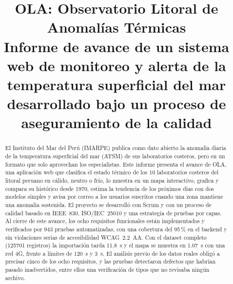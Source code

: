 \documentclass[conference,a4paper]{IEEEtran}
\begin{document}
\title{OLA: Observatorio Litoral de Anomalías Térmicas\\
\large Informe de avance de un sistema web de monitoreo y alerta de la temperatura superficial del mar desarrollado bajo un proceso de aseguramiento de la calidad}

\author{
}

\maketitle

\begin{abstract}
El Instituto del Mar del Perú (IMARPE) publica como dato abierto la anomalía diaria de la temperatura superficial del mar (ATSM) de sus laboratorios costeros, pero en un formato que solo aprovechan los especialistas. Este informe presenta el avance de OLA, una aplicación web que clasifica el estado térmico de los 10 laboratorios costeros del litoral peruano en cálido, neutro o frío, lo muestra en un mapa interactivo, grafica y compara su histórico desde 1970, estima la tendencia de los próximos días con dos modelos simples y avisa por correo a los usuarios suscritos cuando una zona mantiene una anomalía sostenida. El proyecto se desarrolló con Scrum y con un proceso de calidad basado en IEEE~830, ISO/IEC~25010 y una estrategia de pruebas por capas. Al cierre de este avance, los ocho requisitos funcionales están implementados y verificados por 943 pruebas automatizadas, con una cobertura del 95\,\% en el backend y sin violaciones serias de accesibilidad WCAG~2.2~AA. Con el dataset completo (\num{125701} registros) la importación tarda \SI{11.8}{s} y el mapa se muestra en \SI{1.07}{s} con una red 4G, frente a límites de \SI{120}{s} y \SI{3}{s}. El análisis previo de los datos reales obligó a precisar cinco de los ocho requisitos, y las pruebas detectaron defectos que habrían pasado inadvertidos, entre ellos una verificación de tipos que no revisaba ningún archivo.
\end{abstract}
\end{document}
